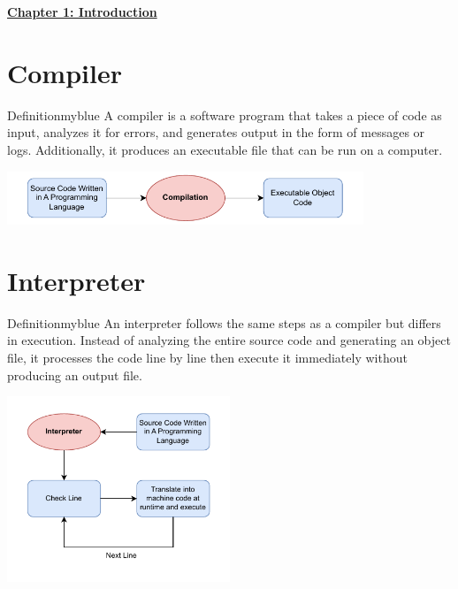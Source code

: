 \begin{center}
    \Huge{\textbf{\underline{Chapter 1: Introduction}}}
\end{center}

\setcounter{section}{0}

\vspace{0.35cm}


\section{Compiler}

\begin{prettyBox}{Definition}{myblue}
A compiler is a software program that takes a piece of code as input, analyzes
it for errors, and generates output in the form of messages or logs.
Additionally, it produces an executable file that can be run on a computer.
\end{prettyBox}

\vspace{0.35cm}
\begin{center}
    \includegraphics[width=0.8\textwidth]{Chapters/Diagram/Intro/compile.drawio.pdf}
\end{center}


\vspace{0.5cm}
\section{Interpreter}

\begin{prettyBox}{Definition}{myblue}
An interpreter follows the same steps as a compiler but differs in execution. Instead of  
analyzing the entire source code and generating an object file, it processes the code  
line by line then execute it immediately without producing an output file.
\end{prettyBox}

\begin{center}
    \includegraphics[width=0.5\textwidth]{Chapters/Diagram/Intro/inter.drawio.pdf}
\end{center}

